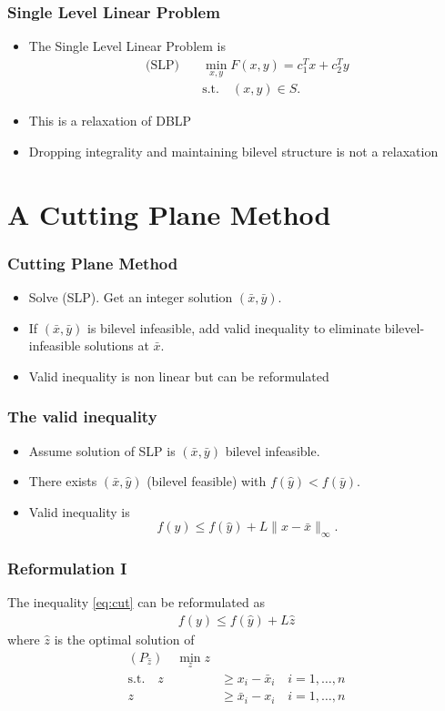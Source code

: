 \documentclass[11pt]{beamer}
\begin{document}
\begin{frame}
	\frametitle{Single Level Linear Problem}
	\begin{itemize}
	\item The Single Level Linear Problem is 
	\begin{align*}
		\text{(SLP)} \quad &\min_{x,y} F(x,y) = c_1^Tx +c_2^Ty \\
		&\text{s.t.} \quad (x,y) \in S.
	\end{align*}
	\item This is a relaxation of DBLP
	\item Dropping integrality and maintaining bilevel structure is not a relaxation
	\end{itemize}
\end{frame}

\section{A Cutting Plane Method}
\begin{frame}
	\frametitle{Cutting Plane Method}
	\begin{itemize}
		\item Solve (SLP). Get an integer solution $(\bar x, \bar y)$.
		\item If $(\bar x, \bar y)$ is bilevel infeasible, add valid inequality to eliminate bilevel-infeasible solutions at $\bar x$.
		\item Valid inequality is non linear but can be reformulated
	\end{itemize}
\end{frame}
	
\begin{frame}
	\frametitle{The valid inequality}
	\begin{itemize}
		\item Assume solution of SLP is $(\bar x, \bar y)$ bilevel infeasible.
		\item There exists $(\bar x, \hat y)$ (bilevel feasible) with $f(\hat y) < f(\bar y)$.
		\item Valid inequality is 
		\begin{equation}
			f(y) \le f(\hat y) + L \|x-\bar x\|_{\infty}. \label{eq:cut}
		\end{equation}
	\end{itemize}
\end{frame}
\begin{frame}
	\frametitle{Reformulation I}
	 The inequality \eqref{eq:cut} can be reformulated as 
		\begin{align*}
			f(y) \le f(\hat y) + L \hat z 
		\end{align*}
		where $\hat z$ is the optimal solution of 
		\begin{align*}
			(P_{\hat z}) \quad \min_{z} z \\
			\text{s.t.} \quad z &\ge x_i - \bar x_i \quad i = 1,\dots,n \\
			z &\ge \bar x_i - x_i \quad i = 1,\dots,n
		\end{align*}
\end{frame}
\end{document}
